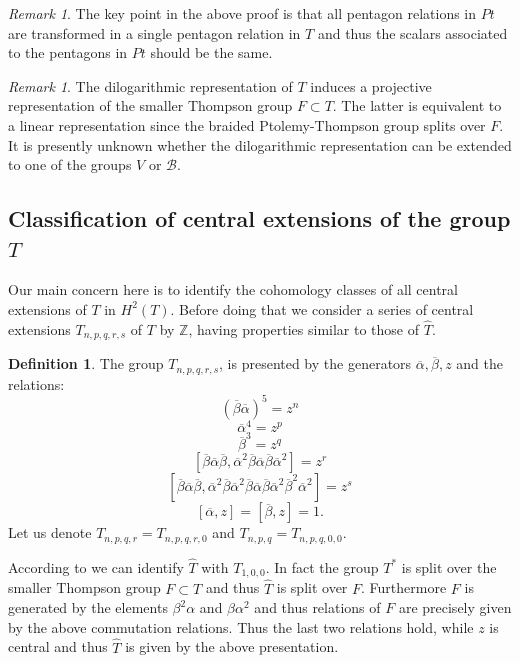 \documentclass[twoside]{irmaems}
\theoremstyle{plain}
\theoremstyle{definition}
\newtheorem{definition}{Definition}[section]
\theoremstyle{remark}
\newtheorem{remark}[theorem]{Remark}
\newcommand{\Z}{{\mathbb{Z}}}
\newcommand{\als}{{\overline{\alpha}}}
\newcommand{\bls}{{\overline{\beta}}}
\begin{document}
\begin{remark}
The key point in the above proof  is that all pentagon relations in $Pt$ 
are transformed in a single pentagon relation in $T$ and thus 
the scalars associated to the pentagons in $Pt$  should be the same.   
\end{remark}


\begin{remark}
The dilogarithmic representation of $T$ induces a projective representation 
of the smaller Thompson group $F\subset T$. The latter is equivalent to a 
linear representation since the braided Ptolemy-Thompson group splits 
over $F$. It is presently 
unknown whether the dilogarithmic representation can be 
extended to one of the groups $V$ or $\mathcal B$.    
\end{remark}


\subsection{Classification of central extensions of the group $T$}
Our main concern here is to  identify the cohomology classes  
of all central extensions of $T$ in $H^2(T)$. 
Before doing that we consider a series of 
central extensions $T_{n,p,q,r,s}$ of $T$ by $\Z$, having properties 
similar to those of  $\widehat{T}$. 

\begin{definition}
The group $T_{n,p,q,r,s}$, is presented by  the generators  
$\als, \bls, z$ and the relations: 
\[ (\bls\als)^5=z^n \]  
\[ \als^4=z^p \]
\[ \bls^3=z^q\]
\[ [\bls\als\bls, \als^2\bls\als\bls\als^2]=z^r\]
\[[\bls\als\bls, \als^2\bls\als^2\bls\als\bls\als^2\bls^2\als^2]=z^s\]
\[ [\als,z]=[\bls,z]=1.\]
Let us denote  $T_{n,p,q,r}=T_{n,p,q,r,0}$ and 
$T_{n,p,q}=T_{n,p,q,0,0}$. 
\end{definition}



\vspace{0.2cm}
\noindent 
According to \cite{fu-ka2} we can identify $\widehat{T}$ with 
$T_{1,0,0}$. In fact the group $T^*$ is split over 
 the smaller Thompson group $F\subset T$ and thus $\widehat{T}$ is 
split over $F$. Furthermore $F$ is generated by the elements 
$\beta^2\alpha$ and $\beta\alpha^2$ and thus relations of $F$ are precisely 
given by the above commutation relations. 
Thus the last two relations hold, while 
$z$ is central and thus $\widehat{T}$ is given by the above 
 presentation. 
\end{document}
